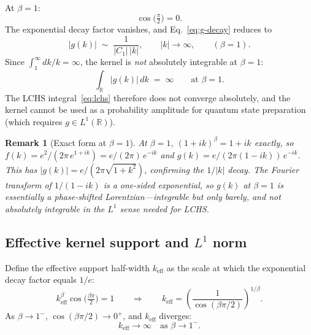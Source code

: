 \documentclass[11pt]{article}
\newtheorem{remark}{Remark}
\begin{document}
At $\beta = 1$:
\begin{equation}\label{eq:cos-zero}
  \cos\!\bigl(\tfrac{\pi}{2}\bigr) = 0.
\end{equation}
The exponential decay factor vanishes, and Eq.~\eqref{eq:g-decay} reduces to
\begin{equation}\label{eq:g-beta1}
  |g(k)| \;\sim\; \frac{1}{|C_1|\,|k|}, \qquad |k| \to \infty,
  \qquad (\beta = 1).
\end{equation}
Since $\int_1^\infty dk/k = \infty$, the kernel is \emph{not} absolutely
integrable at $\beta = 1$:
\begin{equation}\label{eq:diverge}
  \int_{\mathbb{R}} |g(k)|\,dk \;=\; \infty
  \qquad \text{at } \beta = 1.
\end{equation}
The LCHS integral~\eqref{eq:lchs} therefore does not converge absolutely,
and the kernel cannot be used as a probability amplitude for quantum
state preparation (which requires $g \in L^1(\mathbb{R})$).

\begin{remark}[Exact form at $\beta = 1$]
At $\beta = 1$, $(1+ik)^\beta = 1 + ik$ exactly, so
$f(k) = e^{2}/(2\pi\,e^{1+ik}) = e/(2\pi)\,e^{-ik}$ and
$g(k) = e/(2\pi(1-ik))\,e^{-ik}$.
This has $|g(k)| = e/(2\pi\sqrt{1+k^2})$, confirming the $1/|k|$ decay.
The Fourier transform of $1/(1-ik)$ is a one-sided exponential, so $g(k)$
at $\beta = 1$ is essentially a phase-shifted Lorentzian---integrable
but only barely, and not absolutely integrable in the $L^1$ sense needed
for LCHS.
\end{remark}

\subsection{Effective kernel support and $L^1$ norm}

Define the effective support half-width $k_{\mathrm{eff}}$ as the scale
at which the exponential decay factor equals $1/e$:
\begin{equation}\label{eq:keff}
  k_{\mathrm{eff}}^\beta \cos\!\bigl(\tfrac{\beta\pi}{2}\bigr) = 1
  \qquad\Longrightarrow\qquad
  k_{\mathrm{eff}} = \left(\frac{1}{\cos(\beta\pi/2)}\right)^{1/\beta}.
\end{equation}
As $\beta \to 1^-$, $\cos(\beta\pi/2) \to 0^+$, and $k_{\mathrm{eff}}$
diverges:
\begin{equation}\label{eq:keff-diverge}
  k_{\mathrm{eff}} \to \infty \quad \text{as } \beta \to 1^-.
\end{equation}
\end{document}
